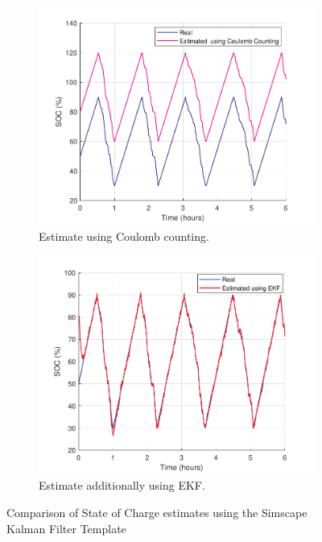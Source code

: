 \begin{figure}[H]
    \centering
    \begin{subfigure}[b]{0.49\textwidth} %
        \centering
        \includegraphics[width=\textwidth]{figs/Samuel/Figures/plotsbattest (1) (cropped) (pdfresizer.com).pdf}
        \caption{Estimate using Coulomb counting.}
        \label{fig:coolomb}
    \end{subfigure}
    \hspace{0\textwidth}
    \begin{subfigure}[b]{0.49\textwidth} %
        \centering
        \includegraphics[width=\textwidth]{figs/Samuel/Figures/plotsbattest (1) (cropped) (pdfresizer.com) (1).pdf}
        \caption{Estimate additionally using \gls{EKF}.}
        \label{fig:kalmeff}
    \end{subfigure}
    \caption[Comparison of State of Charge Estimates]{Comparison of State of Charge estimates using the Simscape Kalman Filter Template}
    \label{fig:bmsestimefk}
\end{figure}


